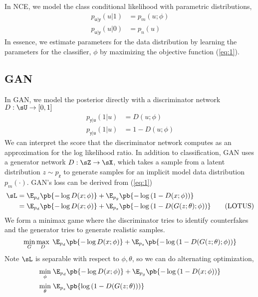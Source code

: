 \documentclass[11pt]{article}
\newcommand\ry{\ensuremath{\mathsf{y}}}
\newcommand\rz{\ensuremath{\mathsf{z}}}
\newcommand\ru{\ensuremath{\mathsf{u}}}
\begin{document}
In NCE, we model the class conditional likelihood with parametric distributions,
\begin{align*}
    p_{\ru|\ry}(u|1)
        &= p_m(u; \phi) \tag{model distribution} \\
    p_{\ru|\ry}(u|0)
        &= p_n(u) \tag{fixed noise distribution}
\end{align*}
In essence, we estimate parameters for the data distribution by learning the parameters for the classifier, $\phi$ by maximizing the objective function (\ref{eq:1}).


\subsection{GAN}

In GAN, we model the posterior directly with a discriminator network $D:\sU\to[0,1]$
\begin{align*}
    p_{\ry|\ru}(1|u)
        &= D(u; \phi) \\
    p_{\ry|\ru}(1|u)
        &= 1-D(u; \phi)
\end{align*}
We can interpret the score that the discriminator network computes as an approximation for the log likelihood ratio. In addition to classification, GAN uses a generator network $D:\sZ\to\sX$, which takes a sample from a latent distribution $z\sim p_{\rz}$ to generate samples for an implicit model data distribution $p_m(\cdot)$. GAN's loss can be derived from (\ref{eq:1})
\begin{align*}
    \sL
        &=  \E_{p_d}\pb{ -\log D(x;\phi) } +  \E_{p_g}\pb{ -\log \left( 1- D(x;\phi) \right) } \\
        &=  \E_{p_d}\pb{ -\log D(x;\phi) } +  \E_{p_z}\pb{ -\log \left( 1- D(G(z;\theta);\phi) \right) } \tag{LOTUS}
\end{align*}
We form a minimax game where the discriminator tries to identify counterfakes and the generator tries to generate realistic samples. 
\[
    \min_{G} \max_{D} \;  \E_{p_d}\pb{ -\log D(x;\phi) } +  \E_{p_z}\pb{ -\log \left( 1- D(G(z;\theta);\phi) \right) }    
\]
Note $\sL$ is separable with respect to $\phi,\theta$, so we can do alternating optimization, 
\begin{align}
    \label{eq:alternating_loss}
    \min_{\phi} \;
        &\E_{p_d}\pb{ -\log D(x;\phi) } + \E_{p_g}\pb{ -\log \left( 1- D(x;\phi) \right) }  \notag \\
    \min_{\theta} \;
        &\E_{p_z}\pb{ \log \left( 1- D(G(z;\theta)) \right) }
\end{align}










\printbibliography 
\end{document}

